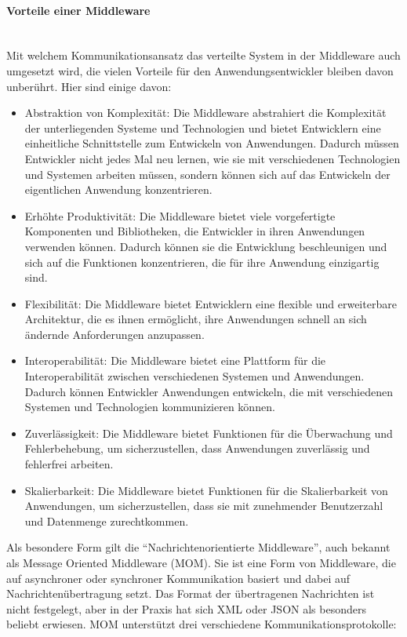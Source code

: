 \documentclass[../vs-script-first-v01.tex]{subfiles}
\begin{document}
\paragraph{Vorteile einer Middleware}
\mbox{}\\
Mit welchem Kommunikationsansatz das verteilte System in der Middleware auch umgesetzt wird, die vielen Vorteile für den Anwendungsentwickler bleiben davon unberührt. Hier sind einige davon:
\begin{itemize}
\item Abstraktion von Komplexität: Die Middleware abstrahiert die Komplexität der unterliegenden Systeme und Technologien und bietet Entwicklern eine einheitliche Schnittstelle zum Entwickeln von Anwendungen. Dadurch müssen Entwickler nicht jedes Mal neu lernen, wie sie mit verschiedenen Technologien und Systemen arbeiten müssen, sondern können sich auf das Entwickeln der eigentlichen Anwendung konzentrieren.

\item Erhöhte Produktivität: Die Middleware bietet viele vorgefertigte Komponenten und Bibliotheken, die Entwickler in ihren Anwendungen verwenden können. Dadurch können sie die Entwicklung beschleunigen und sich auf die Funktionen konzentrieren, die für ihre Anwendung einzigartig sind.

\item Flexibilität: Die Middleware bietet Entwicklern eine flexible und erweiterbare Architektur, die es ihnen ermöglicht, ihre Anwendungen schnell an sich ändernde Anforderungen anzupassen.

\item Interoperabilität: Die Middleware bietet eine Plattform für die Interoperabilität zwischen verschiedenen Systemen und Anwendungen. Dadurch können Entwickler Anwendungen entwickeln, die mit verschiedenen Systemen und Technologien kommunizieren können.

\item Zuverlässigkeit: Die Middleware bietet Funktionen für die Überwachung und Fehlerbehebung, um sicherzustellen, dass Anwendungen zuverlässig und fehlerfrei arbeiten.

\item Skalierbarkeit: Die Middleware bietet Funktionen für die Skalierbarkeit von Anwendungen, um sicherzustellen, dass sie mit zunehmender Benutzerzahl und Datenmenge zurechtkommen.
\end{itemize}
Als besondere Form gilt die \enquote{Nachrichtenorientierte Middleware}, auch bekannt als Message Oriented Middleware (MOM). Sie ist eine Form von Middleware, die auf asynchroner oder synchroner Kommunikation basiert und dabei auf Nachrichtenübertragung setzt. Das Format der übertragenen Nachrichten ist nicht festgelegt, aber in der Praxis hat sich XML oder JSON als besonders beliebt erwiesen. MOM unterstützt drei verschiedene Kommunikationsprotokolle:
\end{document}
